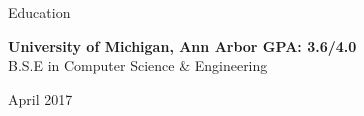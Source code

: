 \documentclass{resume}
\begin{document}

\bigskip
\vspace{-8mm}


\begin{rSection}{Education}

{\bf University of Michigan, Ann Arbor \hfill GPA: 3.6/4.0 \\}
B.S.E in Computer Science \& Engineering \hfill \begin{em} April 2017 \end{em}\\

\vspace{-3mm}
\end{rSection}
\end{document}
